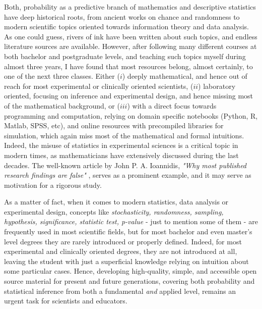 \documentclass{book}
\begin{document}
\medskip

Both, probability as a predictive branch of mathematics and descriptive statistics have deep historical roots, from ancient works on chance and randomness to modern scientific topics oriented towards information theory and data analysis. As one could guess, rivers of ink have been written about such topics, and endless literature sources are available. However, after following many different courses at both bachelor and postgraduate levels, and teaching such topics myself during almost three years, I have found that most resources belong, almost certainly, to one of the next three classes. Either ($i$) deeply mathematical, and hence out of reach for most experimental or clinically oriented scientists, ($ii$) laboratory oriented, focusing on inference and experimental design, and hence missing most of the mathematical background, or ($iii$) with a direct focus towards programming and computation, relying on domain specific notebooks (Python, R, Matlab, SPSS, etc), and online resources with precompiled libraries for simulation, which again miss most of the mathematical and formal intuitions. Indeed, the misuse of statistics in experimental sciences is a critical topic in modern times, as mathematicians have extensively discussed during the last decades. The well-known article by John P. A. Ioannidis, \textit{"Why most published research findings are false"} \cite{ioannidis2005why}, serves as a prominent example, and it may serve as motivation for a rigorous study.

As a matter of fact, when it comes to modern statistics, data analysis or experimental design, concepts like \textit{stochasticity, randomness, sampling, hypothesis, significance, statistic test, p-value} - just to mention some of them - are frequently used in most scientific fields, but for most bachelor and even master's level degrees they are rarely introduced or properly defined. Indeed, for most experimental and clinically oriented degrees, they are not introduced at all, leaving the student with just a superficial knowledge relying on intuition about some particular cases. Hence, developing high-quality, simple, and accessible open source material for present and future generations, covering both probability and statistical inference from both a fundamental \textit{and} applied level, remains an urgent task for scientists and educators.

\medskip
\end{document}

